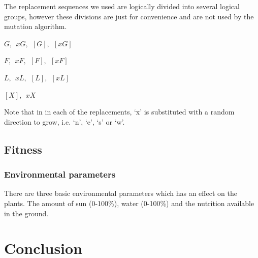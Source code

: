 \documentclass[conference]{acmsiggraph}
\begin{document}
The replacement sequences we used are logically divided into several logical
groups, however these divisions are just for convenience and are not used by the
mutation algorithm.

\begin{description}[leftmargin=!,labelindent=0.2in,labelwidth=0.5in]
  \item[Stems]   $G,~~xG,~~[G],~~[xG]$
  \item[Flowers] $F,~~xF,~~[F],~~[xF]$
  \item[Leaves]  $L,~~xL,~~[L],~~[xL]$
  \item[Other]   $[X],~~xX$
\end{description}

Note that in in each of the replacements, `x' is substituted with a random
direction to grow, i.e. `n', `e', `s' or `w'.

\subsection{Fitness}

% 
% 

\subsubsection{Environmental parameters}

There are three basic environmental parameters which has an effect on the
plants. The amount of sun (0-100\%), water (0-100\%) and the nutrition available
in the ground.

\section{Conclusion}




\end{document}
